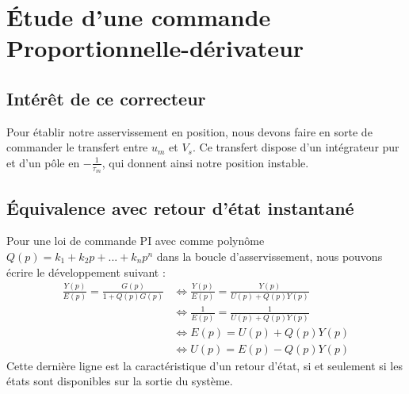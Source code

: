 \chapter{Étude d'une commande Proportionnelle-dérivateur}
\section{Intérêt de ce correcteur}
Pour établir notre asservissement en position, nous devons faire en sorte de commander le transfert entre $u_m$ et $V_s$. Ce transfert dispose d'un intégrateur pur et d'un pôle en $-\frac{1}{\tau _m}$, qui donnent ainsi notre position instable.	
\section{Équivalence avec retour d'état instantané}
Pour une loi de commande PI avec comme polynôme $Q(p) = k_1+k_2p+...+k_np^n$ dans la boucle d'asservissement, nous pouvons écrire le développement suivant : 
\begin{align*}
\frac{Y(p)}{E(p)} = \frac{G(p)}{1 + Q(p)G(p)} & \Leftrightarrow \frac{Y(p)}{E(p)} = \frac{Y(p)}{U(p) + Q(p)Y(p)}\\
&\Leftrightarrow \frac{1}{E(p)} = \frac{1}{U(p) + Q(p)Y(p)} \\
& \Leftrightarrow E(p) = U(p) + Q(p)Y(p)\\
& \Leftrightarrow U(p) = E(p) - Q(p)Y(p)
\end{align*} 
Cette dernière ligne est la caractéristique d'un retour d'état, si et seulement si les états sont disponibles sur la sortie du système.